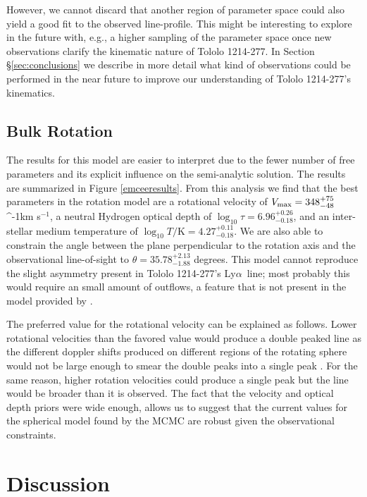 \documentclass[a4paper,fleqn,usenatbib]{mnras}
\newcommand{\tol}{Tololo 1214-277}
\newcommand{\lya}{\ifmmode{{\rm Ly}\alpha}\else Ly$\alpha$\ \fi}
\newcommand{\kms}{\ifmmode\mathrm{km\ s}^{-1}\else km s$^{-1}$\fi}
\begin{document}
However, we cannot discard that another region of parameter space
could also yield a good fit to the observed line-profile.
This might be interesting to explore in the
future with, e.g., a higher sampling of the parameter space once new 
observations  clarify the kinematic nature of \tol. 
In Section \S \ref{sec:conclusions} we describe  in more detail what
kind of observations could be performed in the near future to improve
our understanding of \tol's kinematics. 


\subsection{Bulk Rotation}

The results for this model are easier to interpret due to the fewer
number of free parameters and its explicit influence on the
semi-analytic solution.
The results are summarized in  Figure \ref{emceeresults}. 
From this analysis we find that the best parameters in the rotation
model are a rotational velocity of  $V_{\rm max}=348^{+75}_{-48}$
\kms, a neutral Hydrogen optical depth of
$\log_{10}\tau=6.96^{+0.26}_{-0.18}$,  and an inter-stellar medium
temperature of $\log_{10} T/\mathrm {K} = 4.27^{+0.11}_{-0.18}$.   
We are also able to constrain the angle between the plane
perpendicular to the rotation axis and the observational line-of-sight
to $\theta = 35.78^{+2.13}_{-1.88}$ degrees.
This model cannot reproduce the slight asymmetry present in \tol's
\lya line; most probably this would require an small amount of
outflows, a feature that is not present in the model provided by
\cite{GaravitoCamargo2014}. 

The preferred value for the rotational velocity can be explained as
follows. 
Lower rotational velocities than the favored value would produce a
double peaked line as the different doppler shifts produced on
different regions of the rotating sphere would not be large enough to
smear the double peaks into a single peak
\citep{GaravitoCamargo2014}. 
For the same reason, higher rotation velocities could produce a single
peak but the line would be broader than it is observed.
The fact that the velocity and optical depth priors were wide enough,
allows us to suggest that the current values for the spherical model
found by the MCMC are robust given the observational constraints.






\section{Discussion}
\end{document}
